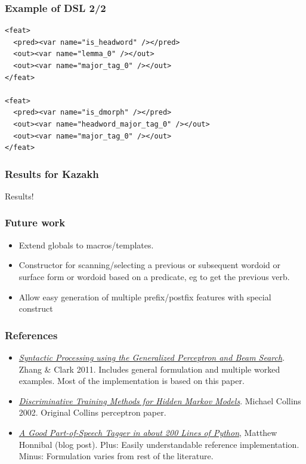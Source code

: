 \documentclass{beamer}
\begin{document}
\begin{frame}[fragile]
\frametitle{Example of DSL 2/2}
{\scriptsize
\begin{verbatim}
<feat>
  <pred><var name="is_headword" /></pred>
  <out><var name="lemma_0" /></out>
  <out><var name="major_tag_0" /></out>
</feat>

<feat>
  <pred><var name="is_dmorph" /></pred>
  <out><var name="headword_major_tag_0" /></out>
  <out><var name="major_tag_0" /></out>
</feat>
\end{verbatim}
}

\end{frame}

\begin{frame}
\frametitle{Results for Kazakh}
Results!
\end{frame}

\begin{frame}
\frametitle{Future work}
\begin{itemize}

  \item Extend globals to macros/templates.

  \item Constructor for scanning/selecting a previous or subsequent wordoid or
    surface form or wordoid based on a predicate, eg to get the previous verb.

  \item Allow easy generation of multiple prefix/postfix features with special
    construct

\end{itemize}
\end{frame}

\begin{frame}
\frametitle{References}
\begin{itemize}

  \item[\raisebox{0.05cm}{\textcolor{yellow}{$\bigstar$}}]
    \textit{\href{http://www.mitpressjournals.org/doi/pdf/10.1162/coli_a_00037}{Syntactic
    Processing using the Generalized Perceptron and Beam Search}}. Zhang \&
    Clark 2011. Includes general formulation and multiple worked examples. Most
    of the implementation is based on this paper.

  \item
    \textit{\href{http://www.cs.columbia.edu/~mcollins/papers/tagperc.pdf}{Discriminative
    Training Methods for Hidden Markov Models}}. Michael Collins 2002.
    Original Collins perceptron paper.

  \item
    \textit{\href{https://spacy.io/blog/part-of-speech-pos-tagger-in-python}{A
    Good Part-of-Speech Tagger in about 200 Lines of Python}}, Matthew Honnibal
    (blog post).  Plus: Easily understandable reference implementation. Minus:
    Formulation varies from rest of the literature.

\end{itemize}
\end{frame}
\end{document}
